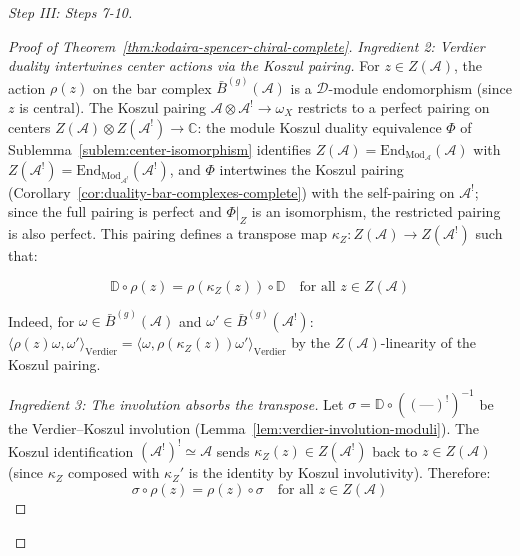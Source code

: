 \begin{proof}[Step III: Steps 7-10]
\begin{proof}[Proof of Theorem~\ref{thm:kodaira-spencer-chiral-complete}]
\emph{Ingredient 2: Verdier duality intertwines center actions via the Koszul pairing.}
For $z \in Z(\mathcal{A})$, the action $\rho(z)$ on the bar complex
$\bar{B}^{(g)}(\mathcal{A})$ is a $\mathcal{D}$-module endomorphism (since $z$ is
central).  The Koszul pairing $\mathcal{A} \otimes \mathcal{A}^! \to \omega_X$ restricts
to a perfect pairing on centers $Z(\mathcal{A}) \otimes Z(\mathcal{A}^!) \to \mathbb{C}$:
the module Koszul duality equivalence $\Phi$ of
Sublemma~\ref{sublem:center-isomorphism} identifies
$Z(\mathcal{A}) = \mathrm{End}_{\mathrm{Mod}_{\mathcal{A}}}(\mathcal{A})$ with
$Z(\mathcal{A}^!) = \mathrm{End}_{\mathrm{Mod}_{\mathcal{A}^!}}(\mathcal{A}^!)$,
and $\Phi$ intertwines the Koszul pairing
(Corollary~\ref{cor:duality-bar-complexes-complete}) with the
self-pairing on $\mathcal{A}^!$; since the full pairing is perfect
and $\Phi|_Z$ is an isomorphism, the restricted pairing is also perfect.  This pairing defines a transpose
map $\kappa_Z: Z(\mathcal{A}) \to Z(\mathcal{A}^!)$ such that:

\begin{equation}\label{eq:verdier-center-intertwine}
\mathbb{D} \circ \rho(z) = \rho(\kappa_Z(z)) \circ \mathbb{D}
\quad \text{for all } z \in Z(\mathcal{A})
\end{equation}

Indeed, for $\omega \in \bar{B}^{(g)}(\mathcal{A})$ and $\omega' \in \bar{B}^{(g)}(\mathcal{A}^!)$:
$\langle \rho(z)\omega, \omega' \rangle_{\mathrm{Verdier}} = \langle \omega, \rho(\kappa_Z(z))\omega' \rangle_{\mathrm{Verdier}}$
by the $Z(\mathcal{A})$-linearity of the Koszul pairing.

\emph{Ingredient 3: The involution absorbs the transpose.}
Let $\sigma = \mathbb{D} \circ ((\text{---})^!)^{-1}$ be the Verdier--Koszul involution
(Lemma~\ref{lem:verdier-involution-moduli}).  The Koszul identification
$(\mathcal{A}^!)^! \simeq \mathcal{A}$ sends $\kappa_Z(z) \in Z(\mathcal{A}^!)$ back to
$z \in Z(\mathcal{A})$ (since $\kappa_Z$ composed with $\kappa_Z'$ is the identity by
Koszul involutivity).  Therefore:
\begin{equation}
\sigma \circ \rho(z) = \rho(z) \circ \sigma
\quad \text{for all } z \in Z(\mathcal{A})
\end{equation}


\end{proof}
\end{proof}
